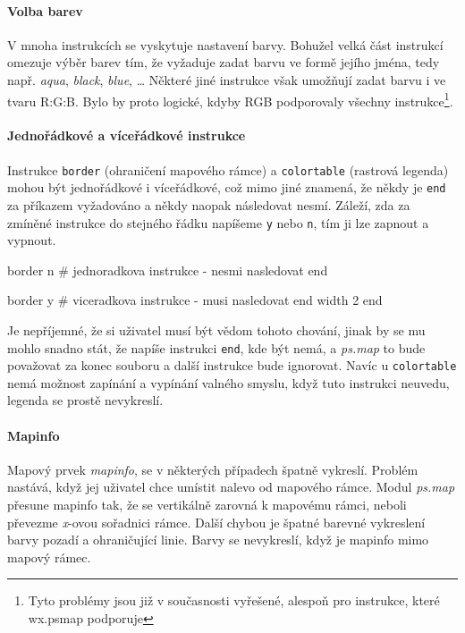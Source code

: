 \documentclass[a4paper,12pt,draft]{article}
\newcommand{\modul}[1]{\emph{#1}}
\newcommand{\instr}[1]{\lstinline[style=psmapInline]|#1|}
\begin{document}
\paragraph*{Volba barev}
\label{sec:psmap:color}
V mnoha instrukcích se vyskytuje nastavení barvy. Bohužel velká část
instrukcí omezuje výběr barev tím, že vyžaduje zadat barvu ve formě
jejího jména, tedy např. \emph{aqua}, \emph{black}, \emph{blue}, \ldots
Některé jiné instrukce však umožňují zadat barvu i ve tvaru R:G:B. Bylo
by proto logické, kdyby RGB podporovaly všechny instrukce\footnote{Tyto
problémy jsou již v současnosti vyřešené, alespoň pro instrukce,
které wx.psmap podporuje}.

\paragraph*{Jednořádkové a víceřádkové instrukce}
\label{sec:psmap:singleline}
Instrukce \instr{border} (ohraničení mapového rámce) a \instr{colortable}
(rastrová legenda) mohou být jednořádkové i víceřádkové, což mimo
jiné znamená, že někdy je \instr{end} za příkazem vyžadováno a někdy
naopak následovat nesmí. Záleží, zda za zmíněné instrukce do stejného
řádku napíšeme \instr{y} nebo \instr{n}, tím ji lze zapnout a vypnout.
\begin{psmap}
border n    # jednoradkova instrukce - nesmi nasledovat end

border y    # viceradkova instrukce - musi nasledovat end
   width 2
end
\end{psmap}
Je nepříjemné, že si uživatel musí být vědom tohoto chování,
jinak by se mu mohlo snadno stát, že napíše instrukci \instr{end}, kde
být nemá, a \modul{ps.map} to bude považovat za konec souboru a další
instrukce bude ignorovat.
Navíc u \instr{colortable} nemá možnost zapínání a vypínání valného
smyslu, když tuto instrukci neuvedu, legenda se prostě nevykreslí.

\paragraph*{Mapinfo}
\label{sec:psmap:mapinfo}
Mapový prvek \emph{mapinfo}, se v některých případech špatně
vykreslí. Problém nastává, když jej uživatel chce umístit nalevo
od mapového rámce. Modul \modul{ps.map} přesune mapinfo tak, že se
vertikálně zarovná k mapovému rámci, neboli převezme \emph{x}-ovou
sořadnici rámce. Další chybou je špatné barevné vykreslení barvy
pozadí a ohraničující linie. Barvy se nevykreslí, když je mapinfo
mimo mapový rámec.
\end{document}
